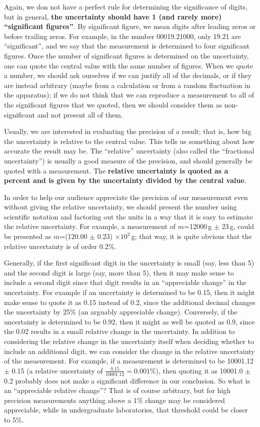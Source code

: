 Again, we don not have a perfect rule for determining the significance of digits, but in general, \textbf{the uncertainty should have 1 (and rarely more) ``significant figures''}. By significant figure, we mean digits after leading zeros or before trailing zeros. For example, in the number 00019.21000, only 19.21 are ``significant'', and we say that the measurement is determined to four significant figures. Once the number of significant figures is determined on the uncertainty, one can quote the central value with the same number of figures. When we quote a number, we should ask ourselves if we can justify all of the decimals, or if they are instead arbitrary (maybe from a calculation or from a random fluctuation in the apparatus); if we do not think that we can reproduce a measurement to all of the significant figures that we quoted, then we should consider them as non-significant and not present all of them.

Usually, we are interested in evaluating the precision of a result; that is, how big the uncertainty is relative to the central value. This tells us something about how accurate the result may be.  The ``relative'' uncertainty (also called the ``fractional uncertainty'') is usually a good measure of the precision, and should generally be quoted with a measurement. The \textbf{relative uncertainty is quoted as a percent and is given by the uncertainty divided by the central value}.

In order to help our audience appreciate the precision of our measurement even without giving the relative uncertainty, we should present the number using scientific notation and factoring out the units in a way that it is easy to estimate the relative uncertainty. For example, a measurement of $m$=12000\,g $\pm$ 23\,g, could be presented as $m$=(120.00 $\pm$ 0.23) $\times 10^2$\,g; that way, it is quite obvious that the relative uncertainty is of order 0.2\%.

Generally, if the first significant digit in the uncertainty is small (say, less than 5) and the second digit is large (say, more than 5), then it may make sense to include a second digit since that digit results in an ``appreciable change'' in the uncertainty. For example if an uncertainty is determined to be 0.15, then it might make sense to quote it as 0.15 instead of 0.2, since the additional decimal changes the uncertainty by 25\% (an arguably appreciable change). Conversely, if the uncertainty is determined to be 0.92, then it might as well be quoted as 0.9, since the 0.02 results in a small relative change in the uncertainty. In addition to considering the relative change in the uncertainty itself when deciding whether to include an additional digit, we can consider the change in the relative uncertainty of the measurement. For example, if a measurement is determined to be 10001.12 $\pm$ 0.15 (a relative uncertainty of $\frac{0.15}{10001.12}=0.001\%$), then quoting it as 10001.0 $\pm$ 0.2 probably does not make a significant difference in our conclusion. So what is an ``appreciable relative change''? That is of course arbitrary, but for high precision measurements anything above a 1\% change may be considered appreciable, while in undergraduate laboratories, that threshold could be closer to 5\%. 

